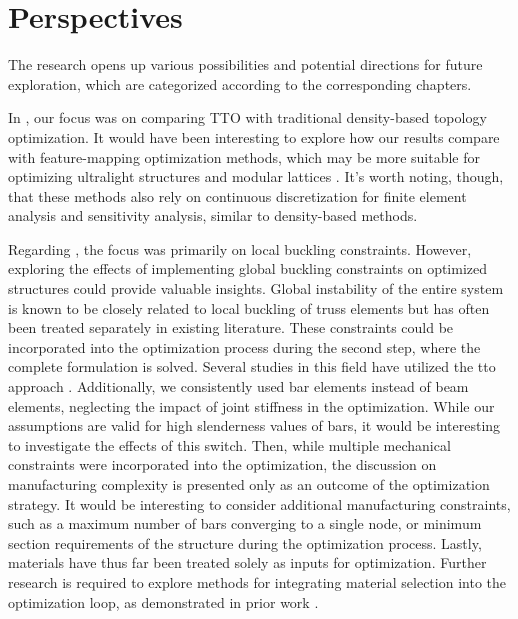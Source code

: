 \section*{Perspectives}
The research opens up various possibilities and potential directions for future exploration, which are categorized according to the corresponding chapters.

In , our focus was on comparing TTO with traditional density-based topology optimization. It would have been interesting to explore how our results compare with feature-mapping optimization methods, which may be more suitable for optimizing ultralight structures and modular lattices . It's worth noting, though, that these methods also rely on continuous discretization for finite element analysis and sensitivity analysis, similar to density-based methods.

Regarding , the focus was primarily on local buckling constraints. However, exploring the effects of implementing global buckling constraints on optimized structures could provide valuable insights. Global instability of the entire system is known to be closely related to local buckling of truss elements  but has often been treated separately in existing literature. These constraints could be incorporated into the optimization process during the second step, where the complete formulation is solved. Several studies in this field have utilized the \gls{tto} approach . Additionally, we consistently used bar elements instead of beam elements, neglecting the impact of joint stiffness in the optimization. While our assumptions are valid for high slenderness values of bars, it would be interesting to investigate the effects of this switch. Then, while multiple mechanical constraints were incorporated into the optimization, the discussion on manufacturing complexity is presented only as an outcome of the optimization strategy. It would be interesting to consider additional manufacturing constraints, such as a maximum number of bars converging to a single node, or minimum section requirements of the structure during the optimization process. Lastly, materials have thus far been treated solely as inputs for optimization. Further research is required to explore methods for integrating material selection into the optimization loop, as demonstrated in prior work .

